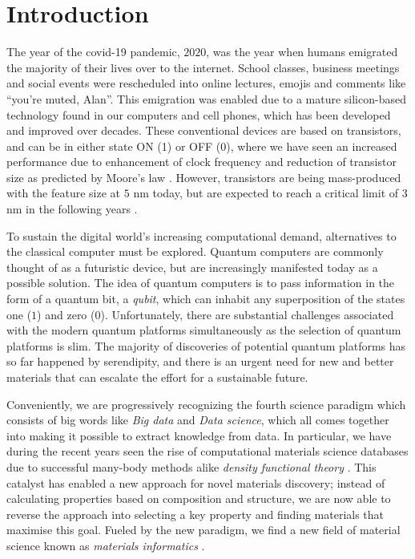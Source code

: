 \chapter{Introduction}

The year of the covid-19 pandemic, $2020$, was the year when humans emigrated the majority of their lives over to the internet. School classes, business meetings and social events were rescheduled into online lectures, emojis and comments like ``you're muted, Alan''. This emigration was enabled due to a mature silicon-based technology found in our computers and cell phones, which has been developed and improved over decades. These conventional devices are based on transistors, and can be in either state ON (1) or OFF (0), where we have seen an increased performance due to enhancement of clock frequency and reduction of transistor size as predicted by Moore's law \cite{Moore1965, Pavicic2006}. However, transistors are being mass-produced with the feature size at $5$ nm today, but are expected to reach a critical limit of $3$ nm in the following years \cite{Gwennap2020}.



To sustain the digital world's increasing computational demand, alternatives to the classical computer must be explored. Quantum computers are commonly thought of as a futuristic device, but are increasingly manifested today as a possible solution. The idea of quantum computers is to pass information in the form of a quantum bit, a \textit{qubit}, which can inhabit any superposition of the states one ($1$) and zero ($0$). Unfortunately, there are substantial challenges associated with the modern quantum platforms simultaneously as the selection of quantum platforms is slim. The majority of discoveries of potential quantum platforms has so far happened by serendipity, and there is an urgent need for new and better materials that can escalate the effort for a sustainable future.

Conveniently, we are progressively recognizing the fourth science paradigm which consists of big words like \textit{Big data} and \textit{Data science}, which all comes together into making it possible to extract knowledge from data. In particular, we have during the recent years seen the rise of computational materials science databases \cite{Curtarolo2012, Curtarolo2012a, Calderon2015, Jain2013, Jain2016, Jain2018, Saal2013, Kirklin2015, Choudhary2020, Allen1987} due to successful many-body methods alike \textit{density functional theory} \cite{Kohn1965}. This catalyst has enabled a new approach for novel materials discovery; instead of calculating properties based on composition and structure, we are now able to reverse the approach into selecting a key property and finding materials that maximise this goal.
Fueled by the new paradigm, we find a new field of material science known as \textit{materials informatics} \cite{Rajan2005}.

